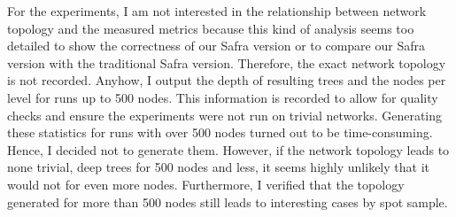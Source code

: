 For the experiments, I am not interested in the relationship between network topology and the measured metrics because this kind of analysis seems too detailed to show the correctness of our Safra version or to compare
our Safra version with the traditional Safra version.
Therefore, the exact network topology is not recorded. 
Anyhow, I output the depth of resulting trees and the nodes per level for runs up to 500 nodes.
This information is recorded to allow for quality checks and ensure the experiments were not run on trivial networks.
Generating these statistics for runs with over 500 nodes turned out to be time-consuming.
Hence, I decided not to generate them.
However, if the network topology leads to none trivial, deep trees for 500 nodes and less, it seems highly unlikely that it would not for even more nodes.
Furthermore, I verified that the topology generated for more than 500 nodes still leads to interesting cases by spot sample.

